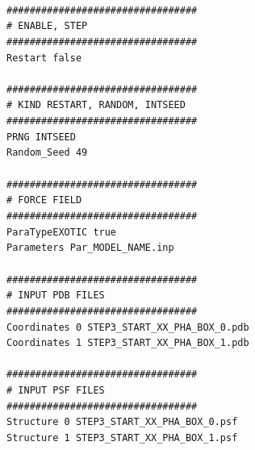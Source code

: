 \texttt{}\\
\texttt{\#\#\#\#\#\#\#\#\#\#\#\#\#\#\#\#\#\#\#\#\#\#\#\#\#\#\#\#\#\#\#\#\#}\\
\texttt{\# ENABLE, STEP}\\
\texttt{\#\#\#\#\#\#\#\#\#\#\#\#\#\#\#\#\#\#\#\#\#\#\#\#\#\#\#\#\#\#\#\#\#}\\
\texttt{Restart	 	false}\\
\texttt{}\\
\texttt{\#\#\#\#\#\#\#\#\#\#\#\#\#\#\#\#\#\#\#\#\#\#\#\#\#\#\#\#\#\#\#\#\#}\\
\texttt{\# KIND {RESTART, RANDOM, INTSEED}}\\
\texttt{\#\#\#\#\#\#\#\#\#\#\#\#\#\#\#\#\#\#\#\#\#\#\#\#\#\#\#\#\#\#\#\#\#}\\
\texttt{PRNG     		INTSEED}\\
\texttt{Random\_Seed  	49}\\
\texttt{}\\
\texttt{\#\#\#\#\#\#\#\#\#\#\#\#\#\#\#\#\#\#\#\#\#\#\#\#\#\#\#\#\#\#\#\#\#}\\
\texttt{\# FORCE FIELD}\\
\texttt{\#\#\#\#\#\#\#\#\#\#\#\#\#\#\#\#\#\#\#\#\#\#\#\#\#\#\#\#\#\#\#\#\#}\\
\texttt{ParaTypeEXOTIC	 true}\\
\texttt{Parameters     	 Par\_MODEL\_NAME.inp}\\
\texttt{}\\
\texttt{\#\#\#\#\#\#\#\#\#\#\#\#\#\#\#\#\#\#\#\#\#\#\#\#\#\#\#\#\#\#\#\#\#}\\
\texttt{\# INPUT PDB FILES}\\
\texttt{\#\#\#\#\#\#\#\#\#\#\#\#\#\#\#\#\#\#\#\#\#\#\#\#\#\#\#\#\#\#\#\#\#}\\
\texttt{Coordinates 0    STEP3\_START\_XX\_PHA\_BOX\_0.pdb}\\
\texttt{Coordinates 1	   STEP3\_START\_XX\_PHA\_BOX\_1.pdb}\\
\texttt{}\\
\texttt{\#\#\#\#\#\#\#\#\#\#\#\#\#\#\#\#\#\#\#\#\#\#\#\#\#\#\#\#\#\#\#\#\#}\\
\texttt{\# INPUT PSF FILES}\\
\texttt{\#\#\#\#\#\#\#\#\#\#\#\#\#\#\#\#\#\#\#\#\#\#\#\#\#\#\#\#\#\#\#\#\#}\\
\texttt{Structure 0  	 STEP3\_START\_XX\_PHA\_BOX\_0.psf}\\
\texttt{Structure 1	 STEP3\_START\_XX\_PHA\_BOX\_1.psf}\\
\texttt{}\\
